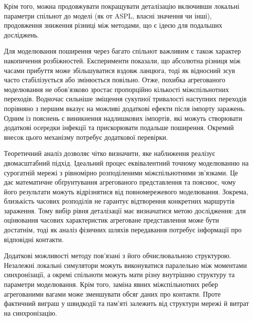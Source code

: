 \documentclass[a4paper,fleqn]{cas-sc}
\begin{document}
Крім того, можна продовжувати покращувати деталізацію включивши локальні параметри спільнот до моделі (як от ASPL, власні значення чи інші), продовження зниження різниці між методами, що є ідеєю для подальших досліджень.

Для моделювання поширення
через багато спільнот
важливим є також характер
накопичення розбіжностей.
Експерименти показали,
що абсолютна різниця
між часами прибуття може
збільшуватися вздовж ланцюга,
тоді як відносний зсув
часто стабілізується
або змінюється повільно.
Отже, похибка агрегованого
моделювання не обов'язково
зростає пропорційно
кількості міжспільнотних
переходів. Водночас
сильніше зміщення
сукупної тривалості
наступних переходів
порівняно з першим
вказує на можливі
додаткові ефекти
після імпорту заражень.
Одним із пояснень
є виникнення надлишкових
імпортів, які можуть
створювати додаткові
осередки інфекції
та прискорювати
подальше поширення.
Окремий внесок цього
механізму потребує
додаткової перевірки.

Теоретичний аналіз
дозволяє чітко визначити,
яке наближення реалізує
двомасштабний підхід.
Ідеальний процес
еквівалентний точному
моделюванню на сурогатній
мережі з рівномірно
розподіленими
міжспільнотними зв'язками.
Це дає математичне
обґрунтування агрегованого
представлення та пояснює,
чому його результати
можуть відрізнятися
від повномережевого
моделювання.
Зокрема, близькість
часових розподілів
не гарантує відтворення
конкретних маршрутів
зараження. Тому вибір
рівня деталізації
має визначатися
метою дослідження:
для оцінювання часових
характеристик агреговане
представлення може бути
достатнім, тоді як
аналіз фізичних шляхів
передавання потребує
інформації про відповідні
контакти.

Додаткові можливості
методу пов'язані
з його обчислювальною
структурою. Незалежні
локальні симулятори
можуть виконуватися
паралельно між моментами
синхронізації, а окремі
спільноти можуть мати
різну внутрішню структуру
та параметри моделювання.
Крім того, заміна
явних міжспільнотних
ребер агрегованими вагами
може зменшувати обсяг
даних про контакти.
Проте фактичний виграш
у швидкодії та пам'яті
залежить від структури
мережі й витрат на
синхронізацію.

\end{document}
